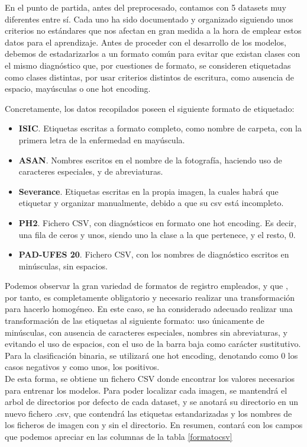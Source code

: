 En el punto de partida, antes del preprocesado, contamos con 5 datasets muy diferentes entre sí. Cada uno ha sido documentado y organizado siguiendo unos criterios no estándares que nos afectan en gran medida a la hora de emplear estos datos para el aprendizaje. Antes de proceder con el desarrollo de los modelos, debemos de estadarizarlos a un formato común para evitar que existan clases con el mismo diagnóstico que, por cuestiones de formato, se consideren etiquetadas como clases distintas, por usar criterios distintos de escritura, como ausencia de espacio, mayúsculas o one hot encoding. 

Concretamente, los datos recopilados poseen el siguiente formato de etiquetado:
\begin{itemize}
	\item \textbf{ISIC}. Etiquetas escritas a formato completo, como nombre de carpeta, con la primera letra de la enfermedad en mayúscula.
	\item  \textbf{ASAN}. Nombres escritos en el nombre de la fotografía, haciendo uso de caracteres especiales, y de abreviaturas.
	\item  \textbf{Severance}. Etiquetas escritas en la propia imagen, la cuales habrá que etiquetar y organizar manualmente, debido a que su csv está incompleto.
	\item  \textbf{PH2}. Fichero CSV, con diagnósticos en formato one hot encoding. Es decir, una fila de ceros y unos, siendo uno la clase a la que pertenece, y el resto, 0.
	\item  \textbf{PAD-UFES 20}. Fichero CSV, con los nombres de diagnóstico escritos en minúsculas, sin espacios.
\end{itemize}

Podemos observar la gran variedad de formatos de registro empleados, y que , por tanto, es completamente obligatorio y necesario realizar una transformación para hacerlo homogéneo. En este caso, se ha considerado adecuado realizar una transformación de las etiquetas al siguiente formato: uso únicamente de minúsculas, con ausencia de caracteres especiales, nombres sin abreviaturas, y evitando el uso de espacios, con el uso de la barra baja como carácter sustitutivo. Para la clasificación binaria, se utilizará one hot encoding, denotando como 0 los casos negativos y como unos, los positivos.\\


De esta forma, se obtiene un fichero CSV donde encontrar los valores necesarios para entrenar los modelos. Para poder localizar cada imagen, se mantendrá el arbol de directorios por defecto de cada dataset, y se anotará su directorio en un nuevo fichero .csv, que contendrá las etiquetas estandarizadas y los nombres de los ficheros de imagen con y sin el directorio. En resumen, contará con los campos que podemos apreciar en las columnas de la tabla \ref{formatocsv}

